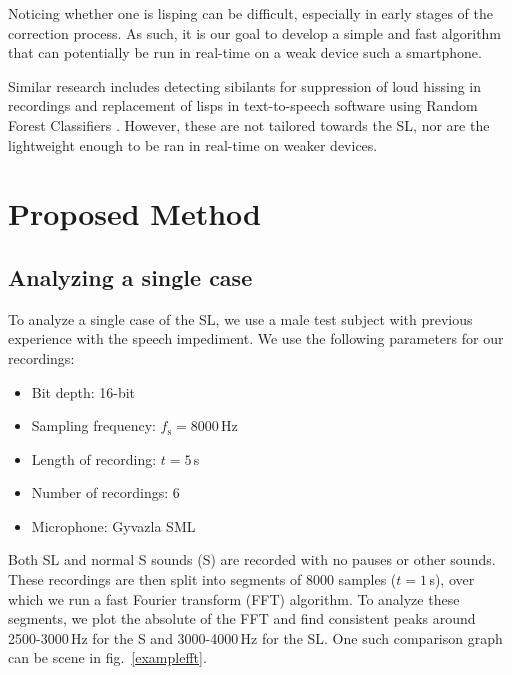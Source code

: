 \documentclass{IEEEtran}
\begin{document}
Noticing whether one is lisping can be difficult,
especially in early stages of the correction process.
As such,
it is our goal to develop a simple and fast algorithm that can potentially be run in real-time on a weak device such a smartphone.

Similar research includes detecting sibilants for suppression of loud hissing in recordings \cite{Gonzalez} \cite{de-ess} and replacement of lisps in text-to-speech software using Random Forest Classifiers \cite{Itagi}.
However,
these are not tailored towards the SL,
nor are the lightweight enough to be ran in real-time on weaker devices.

\section{Proposed Method}

\subsection{Analyzing a single case}\label{analyze}

To analyze a single case of the SL,
we use a male test subject with previous experience with the speech impediment.
We use the following parameters for our recordings:

\begin{itemize}
	\item Bit depth: 16-bit
	\item Sampling frequency: \(f_\mathrm{s} = 8000\)\,Hz
	\item Length of recording: \(t = 5\)\,s
	\item Number of recordings: 6
	\item Microphone: Gyvazla SML
\end{itemize}

Both SL and normal S sounds (S) are recorded with no pauses or other sounds.
These recordings are then split into segments of 8000 samples (\(t = 1\)\,s),
over which we run a fast Fourier transform (FFT) algorithm.
To analyze these segments, we plot the absolute of the FFT and find consistent peaks around 2500-3000\,Hz for the S and 3000-4000\,Hz for the SL.
One such comparison graph can be scene in fig.\ \ref{examplefft}.
\end{document}
